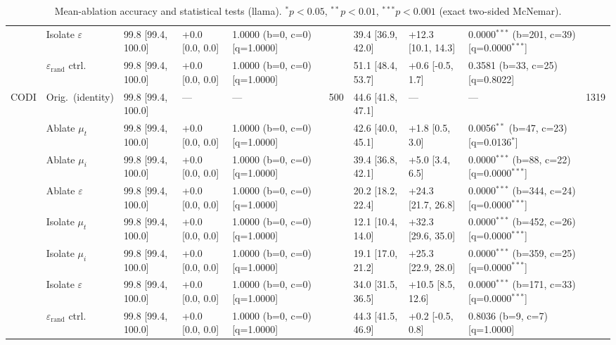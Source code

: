 \begin{table}[h!]
\begin{tabular}{ll lllc lllc}
 & Isolate $\varepsilon$ & 99.8 [99.4, 100.0] & +0.0 [0.0, 0.0] & 1.0000 (b=0, c=0) [q=1.0000] &  & 39.4 [36.9, 42.0] & +12.3 [10.1, 14.3] & 0.0000$^{***}$ (b=201, c=39) [q=0.0000$^{***}$] &  \\
 & $\varepsilon_\mathrm{rand}$ ctrl. & 99.8 [99.4, 100.0] & +0.0 [0.0, 0.0] & 1.0000 (b=0, c=0) [q=1.0000] &  & 51.1 [48.4, 53.7] & +0.6 [-0.5, 1.7] & 0.3581 (b=33, c=25) [q=0.8022] &  \\
\cmidrule(lr){2-10}
\multirow{8}{*}{CODI} & Orig.\ (identity) & 99.8 [99.4, 100.0] & --- & --- & 500 & 44.6 [41.8, 47.1] & --- & --- & 1319 \\
 & Ablate $\mu_t$ & 99.8 [99.4, 100.0] & +0.0 [0.0, 0.0] & 1.0000 (b=0, c=0) [q=1.0000] &  & 42.6 [40.0, 45.1] & +1.8 [0.5, 3.0] & 0.0056$^{**}$ (b=47, c=23) [q=0.0136$^{*}$] &  \\
 & Ablate $\mu_i$ & 99.8 [99.4, 100.0] & +0.0 [0.0, 0.0] & 1.0000 (b=0, c=0) [q=1.0000] &  & 39.4 [36.8, 42.1] & +5.0 [3.4, 6.5] & 0.0000$^{***}$ (b=88, c=22) [q=0.0000$^{***}$] &  \\
 & Ablate $\varepsilon$ & 99.8 [99.4, 100.0] & +0.0 [0.0, 0.0] & 1.0000 (b=0, c=0) [q=1.0000] &  & 20.2 [18.2, 22.4] & +24.3 [21.7, 26.8] & 0.0000$^{***}$ (b=344, c=24) [q=0.0000$^{***}$] &  \\
 & Isolate $\mu_t$ & 99.8 [99.4, 100.0] & +0.0 [0.0, 0.0] & 1.0000 (b=0, c=0) [q=1.0000] &  & 12.1 [10.4, 14.0] & +32.3 [29.6, 35.0] & 0.0000$^{***}$ (b=452, c=26) [q=0.0000$^{***}$] &  \\
 & Isolate $\mu_i$ & 99.8 [99.4, 100.0] & +0.0 [0.0, 0.0] & 1.0000 (b=0, c=0) [q=1.0000] &  & 19.1 [17.0, 21.2] & +25.3 [22.9, 28.0] & 0.0000$^{***}$ (b=359, c=25) [q=0.0000$^{***}$] &  \\
 & Isolate $\varepsilon$ & 99.8 [99.4, 100.0] & +0.0 [0.0, 0.0] & 1.0000 (b=0, c=0) [q=1.0000] &  & 34.0 [31.5, 36.5] & +10.5 [8.5, 12.6] & 0.0000$^{***}$ (b=171, c=33) [q=0.0000$^{***}$] &  \\
 & $\varepsilon_\mathrm{rand}$ ctrl. & 99.8 [99.4, 100.0] & +0.0 [0.0, 0.0] & 1.0000 (b=0, c=0) [q=1.0000] &  & 44.3 [41.5, 46.9] & +0.2 [-0.5, 0.8] & 0.8036 (b=9, c=7) [q=1.0000] &  \\
\bottomrule
\end{tabular}
\caption{Mean-ablation accuracy and statistical tests (llama). $^{*}p{<}0.05$, $^{**}p{<}0.01$, $^{***}p{<}0.001$ (exact two-sided McNemar).}
\label{tab:mean_ablation_stats_llama}
\end{table}